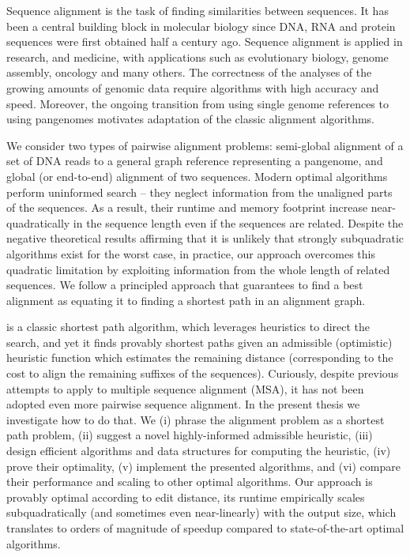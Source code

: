 Sequence alignment is the task of finding similarities between sequences. It has
been a central building block in molecular biology since DNA, RNA and protein
sequences were first obtained half a century ago. Sequence alignment is applied
in research, and medicine, with applications such as evolutionary biology,
genome assembly, oncology and many others. The correctness of the analyses of
the growing amounts of genomic data require algorithms with high accuracy and
speed. Moreover, the ongoing transition from using single genome references to
using pangenomes motivates adaptation of the classic alignment algorithms.

We consider two types of pairwise alignment problems: semi-global alignment of a
set of DNA reads to a general graph reference representing a pangenome, and
global (or end-to-end) alignment of two sequences. Modern optimal algorithms
perform uninformed search -- they neglect information from the unaligned parts of
the sequences. As a result, their runtime and memory footprint increase
near-quadratically in the sequence length even if the sequences are related.
Despite the negative theoretical results affirming that it is unlikely that
strongly subquadratic algorithms exist for the worst case, in practice, our
approach overcomes this quadratic limitation by exploiting information from the
whole length of related sequences. We follow a principled approach that
guarantees to find a best alignment as equating it to finding a shortest path in
an alignment graph.

\A is a classic shortest path algorithm, which leverages heuristics to direct
the search, and yet it finds provably shortest paths given an admissible
(optimistic) heuristic function which estimates the remaining distance
(corresponding to the cost to align the remaining suffixes of the sequences).
Curiously, despite previous attempts to apply \A to multiple sequence alignment
(MSA), it has not been adopted even more pairwise sequence alignment. In the
present thesis we investigate how to do that. We (i) phrase the alignment
problem as a shortest path problem, (ii) suggest a novel highly-informed
admissible heuristic, (iii) design efficient algorithms and data structures for
computing the heuristic, (iv) prove their optimality, (v) implement the
presented algorithms, and (vi) compare their performance and scaling to other
optimal algorithms. Our approach is provably optimal according to edit distance,
its runtime empirically scales subquadratically (and sometimes even
near-linearly) with the output size, which translates to orders of magnitude of
speedup compared to state-of-the-art optimal algorithms.

